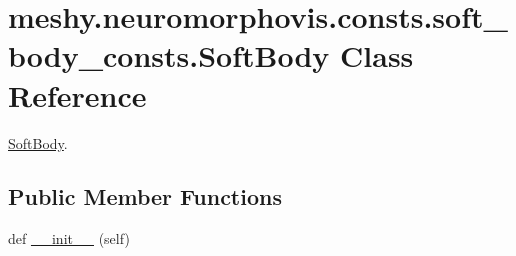 \hypertarget{classmeshy_1_1neuromorphovis_1_1consts_1_1soft__body__consts_1_1SoftBody}{}\section{meshy.\+neuromorphovis.\+consts.\+soft\+\_\+body\+\_\+consts.\+Soft\+Body Class Reference}
\label{classmeshy_1_1neuromorphovis_1_1consts_1_1soft__body__consts_1_1SoftBody}


\hyperlink{classmeshy_1_1neuromorphovis_1_1consts_1_1soft__body__consts_1_1SoftBody}{Soft\+Body}.  


\subsection*{Public Member Functions}
\begin{DoxyCompactItemize}
\item 
def \hyperlink{classmeshy_1_1neuromorphovis_1_1consts_1_1soft__body__consts_1_1SoftBody_a65211e47de6cdf718ace543d0f255341}{\+\_\+\+\_\+init\+\_\+\+\_\+} (self)\hypertarget{classmeshy_1_1neuromorphovis_1_1consts_1_1soft__body__consts_1_1SoftBody_a65211e47de6cdf718ace543d0f255341}{}\label{classmeshy_1_1neuromorphovis_1_1consts_1_1soft__body__consts_1_1SoftBody_a65211e47de6cdf718ace543d0f255341}

\end{DoxyCompactItemize}

